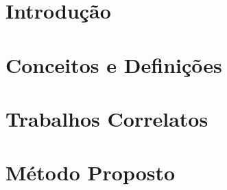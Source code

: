 \documentclass[
    12pt,       %
    oneside,    %
    a4paper,    %
%
    chapter=TITLE,	  	  %
%
    english,			  %
    brazil				  %
%
]{abntex2}
\begin{document}
\renewcommand{\contentsname}{Sumário}
\tableofcontents*
\cleardoublepage{}



\textual{}
\chapter{Introdução}\label{ch:introducao}


\chapter{Conceitos e Definições}\label{ch:fundamentacao}


\chapter{Trabalhos Correlatos}\label{ch:correlatos}



\chapter{Método Proposto}\label{ch:metodo}



\end{document}
